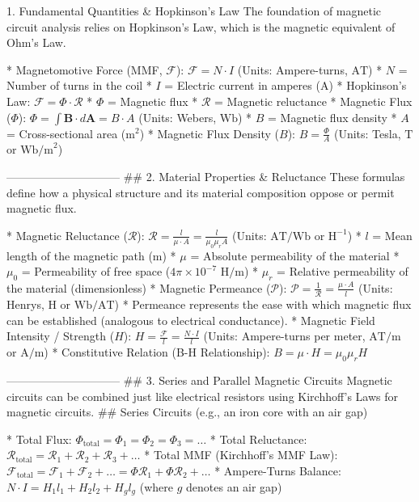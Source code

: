 1. Fundamental Quantities & Hopkinson's Law
The foundation of magnetic circuit analysis relies on Hopkinson's Law, which is the magnetic equivalent of Ohm's Law.

* Magnetomotive Force (MMF, $\mathcal{F}$): $\mathcal{F} = N \cdot I$ (Units: Ampere-turns, $\text{AT}$)
* $N$ = Number of turns in the coil
   * $I$ = Electric current in amperes ($\text{A}$)
* Hopkinson's Law: $\mathcal{F} = \Phi \cdot \mathcal{R}$
* $\Phi$ = Magnetic flux
   * $\mathcal{R}$ = Magnetic reluctance
* Magnetic Flux ($\Phi$): $\Phi = \int \mathbf{B} \cdot d\mathbf{A} = B \cdot A$ (Units: Webers, $\text{Wb}$)
* $B$ = Magnetic flux density
   * $A$ = Cross-sectional area ($\text{m}^2$)
* Magnetic Flux Density ($B$): $B = \frac{\Phi}{A}$ (Units: Tesla, $\text{T}$ or $\text{Wb/m}^2$)

------------------------------
## 2. Material Properties & Reluctance
These formulas define how a physical structure and its material composition oppose or permit magnetic flux.

* Magnetic Reluctance ($\mathcal{R}$): $\mathcal{R} = \frac{l}{\mu \cdot A} = \frac{l}{\mu_0 \mu_r A}$ (Units: $\text{AT/Wb}$ or $\text{H}^{-1}$)
* $l$ = Mean length of the magnetic path ($\text{m}$)
   * $\mu$ = Absolute permeability of the material
   * $\mu_0$ = Permeability of free space ($4\pi \times 10^{-7} \text{ H/m}$)
   * $\mu_r$ = Relative permeability of the material (dimensionless)
* Magnetic Permeance ($\mathcal{P}$): $\mathcal{P} = \frac{1}{\mathcal{R}} = \frac{\mu \cdot A}{l}$ (Units: Henrys, $\text{H}$ or $\text{Wb/AT}$)
* Permeance represents the ease with which magnetic flux can be established (analogous to electrical conductance).
* Magnetic Field Intensity / Strength ($H$): $H = \frac{\mathcal{F}}{l} = \frac{N \cdot I}{l}$ (Units: Ampere-turns per meter, $\text{AT/m}$ or $\text{A/m}$)
* Constitutive Relation (B-H Relationship): $B = \mu \cdot H = \mu_0 \mu_r H$

------------------------------
## 3. Series and Parallel Magnetic Circuits
Magnetic circuits can be combined just like electrical resistors using Kirchhoff's Laws for magnetic circuits.
## Series Circuits (e.g., an iron core with an air gap)

* Total Flux: $\Phi_{\text{total}} = \Phi_1 = \Phi_2 = \Phi_3 = \dots$
* Total Reluctance: $\mathcal{R}_{\text{total}} = \mathcal{R}_1 + \mathcal{R}_2 + \mathcal{R}_3 + \dots$
* Total MMF (Kirchhoff's MMF Law): $\mathcal{F}_{\text{total}} = \mathcal{F}_1 + \mathcal{F}_2 + \dots = \Phi \mathcal{R}_1 + \Phi \mathcal{R}_2 + \dots$
* Ampere-Turns Balance: $N \cdot I = H_1 l_1 + H_2 l_2 + H_g l_g$ (where $g$ denotes an air gap)

